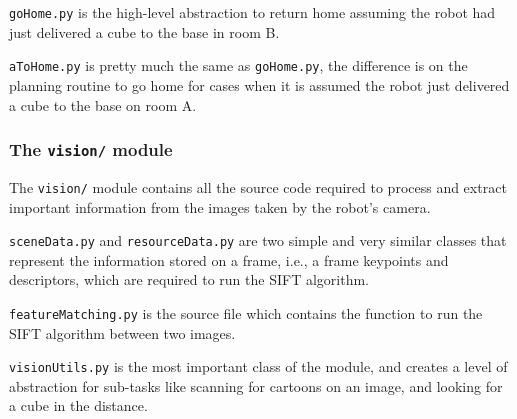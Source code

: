 \texttt{goHome.py} is the high-level abstraction to return home assuming the robot had just delivered a cube to the base in room B.

\texttt{aToHome.py} is pretty much the same as \texttt{goHome.py}, the difference is on the planning routine to go home for cases when it is assumed the robot just delivered a cube to the base on room A.


\subsubsection{The \texttt{vision/} module}

The \texttt{vision/} module contains all the source code required to process and extract important information from the images taken by the robot's camera.

\texttt{sceneData.py} and \texttt{resourceData.py} are two simple and very similar classes that represent the information stored on a frame, i.e., a frame keypoints and descriptors, which are required to run the SIFT algorithm.

\texttt{featureMatching.py} is the source file which contains the function to run the SIFT algorithm between two images.

\texttt{visionUtils.py} is the most important class of the module, and creates a level of abstraction for sub-tasks like scanning for cartoons on an image, and looking for a cube in the distance.

\newpage
